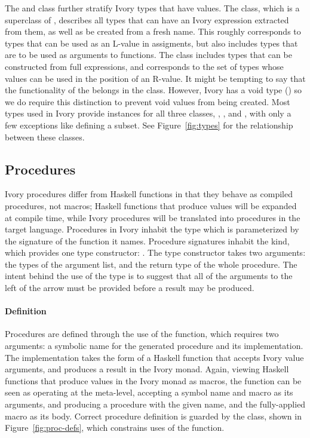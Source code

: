 The  and  class further stratify Ivory types that
have values.  The  class, which is a superclass of ,
describes all types that can have an Ivory expression extracted from them, as
well as be created from a fresh name.  This roughly corresponds to types that
can be used as an L-value in assigments, but also includes types that are to be
used as arguments to functions.  The  class includes types that
can be constructed from full expressions, and corresponds to the set of types
whose values can be used in the position of an R-value.  It might be tempting to
say that the functionality of the  belongs in the 
class. However, Ivory has a void type (\cd{()}) so we do require this distinction
to prevent void values from being created.  Most types used in Ivory
provide instances for all three classes, , , and
, with only a few exceptions like \cd{()} defining a subset.  See
Figure~\ref{fig:types} for the relationship between these classes.

\subsection{Procedures}
\label{sec:proc}

Ivory procedures differ from Haskell functions in that they behave as compiled
procedures, not macros; Haskell functions that produce  values will be
expanded at compile time, while Ivory procedures will be translated into
procedures in the target language.  Procedures in Ivory inhabit the 
type which is parameterized by the signature of the function it names.
Procedure signatures inhabit the  kind, which provides one type
constructor: \cd{:->}.  The \cd{:->} type constructor takes two arguments: the
types of the argument list, and the return type of the whole procedure.  The
intent behind the use of the \cd{:->} type is to suggest that all of the
arguments to the left of the arrow must be provided before a result may be
produced.

\paragraph{Definition}

Procedures are defined through the use of the  function, which requires
two arguments: a symbolic name for the generated procedure and its
implementation.  The implementation takes the form of a Haskell function that
accepts Ivory value arguments, and produces a result in the Ivory monad.  Again,
viewing Haskell functions that produce values in the Ivory monad as macros, the
 function can be seen as operating at the meta-level, accepting a
symbol name and macro as its arguments, and producing a procedure with the given
name, and the fully-applied macro as its body.  Correct procedure definition is
guarded by the  class, shown in Figure~\ref{fig:proc-defs},
which constrains uses of the  function.

